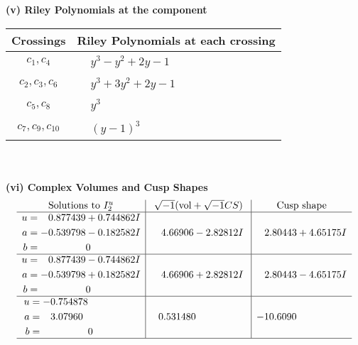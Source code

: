 \documentclass[1p]{elsarticle_modified}
\theoremstyle{definition}
\newcommand{\I}{\sqrt{-1}}
\begin{document}
\flushleft \textbf{(v) Riley Polynomials at the component}\newline \\
\begin{tabular}{m{50pt}|m{274pt}}
Crossings & \hspace{64pt}Riley Polynomials at each crossing \\
\hline $$\begin{aligned}c_{1},c_{4}\end{aligned}$$&$\begin{aligned}
&y^3- y^2+2 y-1
\end{aligned}$\\
\hline $$\begin{aligned}c_{2},c_{3},c_{6}\end{aligned}$$&$\begin{aligned}
&y^3+3 y^2+2 y-1
\end{aligned}$\\
\hline $$\begin{aligned}c_{5},c_{8}\end{aligned}$$&$\begin{aligned}
&y^3
\end{aligned}$\\
\hline $$\begin{aligned}c_{7},c_{9},c_{10}\end{aligned}$$&$\begin{aligned}
&(y-1)^3
\end{aligned}$\\
\hline
\end{tabular}\\~\\
\newpage\flushleft \textbf{(vi) Complex Volumes and Cusp Shapes}
$$\begin{array}{c|c|c}  
\text{Solutions to }I^u_{2}& \I (\text{vol} + \sqrt{-1}CS) & \text{Cusp shape}\\
 \hline 
\begin{aligned}
u &= \phantom{-}0.877439 + 0.744862 I \\
a &= -0.539798 - 0.182582 I \\
b &= \phantom{-0.000000 } 0\end{aligned}
 & \phantom{-}4.66906 - 2.82812 I & \phantom{-}2.80443 + 4.65175 I \\ \hline\begin{aligned}
u &= \phantom{-}0.877439 - 0.744862 I \\
a &= -0.539798 + 0.182582 I \\
b &= \phantom{-0.000000 } 0\end{aligned}
 & \phantom{-}4.66906 + 2.82812 I & \phantom{-}2.80443 - 4.65175 I \\ \hline\begin{aligned}
u &= -0.754878\phantom{ +0.000000I} \\
a &= \phantom{-}3.07960\phantom{ +0.000000I} \\
b &= \phantom{-0.000000 } 0\end{aligned}
 & \phantom{-}0.531480\phantom{ +0.000000I} & -10.6090\phantom{ +0.000000I}\\
 \hline 
 \end{array}$$\newpage\newpage\renewcommand{\arraystretch}{1}
\end{document}
